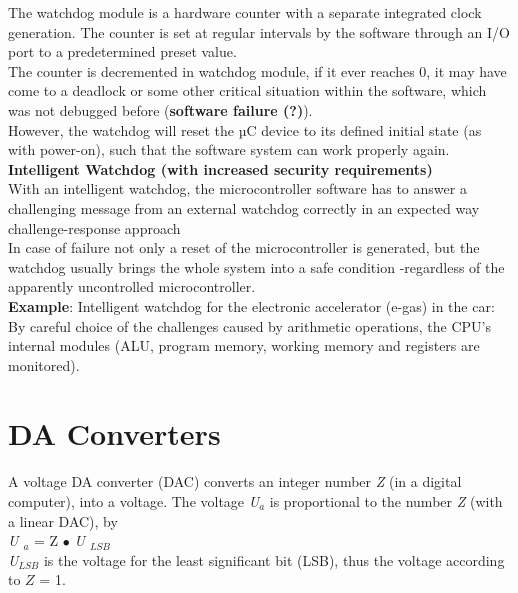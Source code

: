 The watchdog module is a hardware counter with a separate integrated clock generation. The counter is set at regular intervals by the software through an I/O port to a predetermined preset value.\\

The counter is decremented in watchdog module, if it ever reaches 0, it may have come to a deadlock or some other critical situation within the software, which was not debugged before (\textbf{software failure (?)}). \\

However, the watchdog will reset the µC device to its defined initial state (as with power-on), such that the software system can work properly again.\\

{\rot\bf Intelligent Watchdog (with increased security requirements)}\\

With an intelligent watchdog, the microcontroller software has to answer a challenging message from an external watchdog correctly in an expected way  challenge-response approach\\

In case of failure not only a reset of the microcontroller is generated, but the watchdog usually brings the whole system into a safe condition -regardless of the apparently uncontrolled microcontroller.\\

\textbf{Example}: Intelligent watchdog for the electronic accelerator (e-gas) in the car:\\
By careful choice of the challenges caused by arithmetic operations, the CPU's internal modules (ALU, program memory, working memory and registers are monitored).

\section{DA Converters}

A  voltage DA converter (DAC) converts an integer number \textit{Z} (in a digital computer), into a voltage. The voltage \textit{U${}_{a}$} is proportional to the number \textit{Z} (with a linear DAC), by\\

\textit{U ${}_{a}$} = Z $\mathrm{\bullet}$ \textit{U ${}_{LSB}$}\\

\textit{U${}_{LSB}$} is the voltage for the least significant bit (LSB), thus the voltage according to \textit{$Z$} = 1.\\

